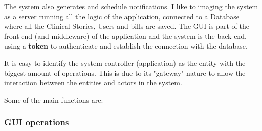 \documentclass{article}
\begin{document}
            The system also generates and schedule notifications. I like to imaging the system as a server running all the logic of the application, connected to a Database where all the Clinical Stories, Users and bills are saved.
            The GUI is part of the front-end (and middleware) of the application and the system is the back-end, using a \textbf{token} to authenticate and establish the connection with the database.
            
            It is easy to identify the system controller (application) as the entity with the biggest amount of operations. This is due to its "gateway" nature to allow the  interaction between the entities and actors in the system.
            
            Some of the main functions are:

            \subsubsection{GUI operations}
\end{document}
